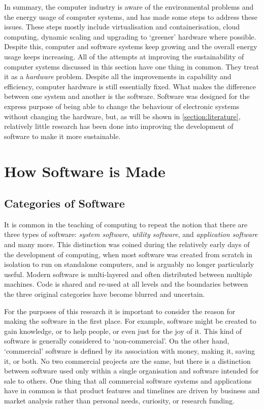 In summary, the computer industry is aware of the environmental problems and the energy usage of computer systems, and has made some steps to address these issues. These steps mostly include \gls{virtualisation} and \gls{containerisation}, \gls{cloud computing}, \gls{dynamic scaling} and \gls{upgrading} to `greener' hardware where possible. Despite this, computer and software systems keep growing and the overall energy usage keeps increasing. All of the attempts at improving the sustainability of computer systems discussed in this section have one thing in common. They treat it as a \emph{hardware} problem. Despite all the improvements in capability and efficiency, computer hardware is still essentially fixed. What makes the difference between one system and another is the software. Software was designed for the express purpose of being able to change the behaviour of electronic systems without changing the hardware, but, as will be shown in \autoref{section:literature}, relatively little research has been done into improving the development of software to make it more sustainable.

\section{How Software is Made}
\label{section:context development}

\subsection{Categories of Software}

It is common in the teaching of computing to repeat the notion that there are three types of software: \emph{system software}, \emph{utility software}, and \emph{application software} \citep{FuturelearnTypes} \citep{Gupta2023a} \citep{Various2023} and many more. This distinction was coined during the relatively early days of the development of computing, when most software was created from scratch in isolation to run on standalone computers, and is arguably no longer particularly useful. Modern software is multi-layered and often distributed between multiple machines. Code is shared and re-used at all levels and the boundaries between the three original categories have become blurred and uncertain.

For the purposes of this research it is important to consider the reason for making the software in the first place. For example, software might be created to gain knowledge, or to help people, or even just for the joy of it. This kind of software is generally considered to `non-commercial'. On the other hand, `commercial' software is defined by its association with money, making it, saving it, or both. No two commercial projects are the same, but there is a distinction between software used only within a single organisation and software intended for sale to others. One thing that all commercial software systems and applications have in common is that product features and timelines are driven by business and market analysis rather than personal needs, curiosity, or research funding.

